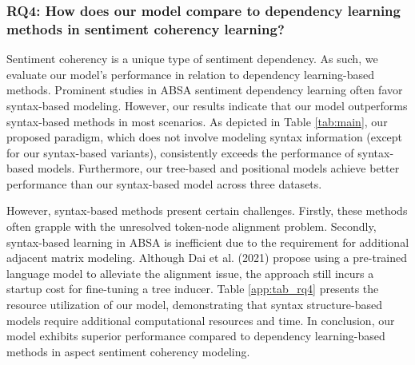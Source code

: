 \subsubsection*{RQ4: How does our model compare to dependency learning methods in sentiment coherency learning?}
\label{sec:rq4}

Sentiment coherency is a unique type of sentiment dependency. As such, we evaluate our model's performance in relation to dependency learning-based methods. Prominent studies in ABSA sentiment dependency learning often favor syntax-based modeling. However, our results indicate that our model outperforms syntax-based methods in most scenarios. As depicted in Table \ref{tab:main}, our proposed paradigm, which does not involve modeling syntax information (except for our syntax-based variants), consistently exceeds the performance of syntax-based models. Furthermore, our tree-based and positional models achieve better performance than our syntax-based model across three datasets.

However, syntax-based methods present certain challenges. Firstly, these methods often grapple with the unresolved token-node alignment problem. Secondly, syntax-based learning in ABSA is inefficient due to the requirement for additional adjacent matrix modeling. Although Dai et al. (2021) propose using a pre-trained language model to alleviate the alignment issue, the approach still incurs a startup cost for fine-tuning a tree inducer. Table \ref{app:tab_rq4} presents the resource utilization of our model, demonstrating that syntax structure-based models require additional computational resources and time. In conclusion, our model exhibits superior performance compared to dependency learning-based methods in aspect sentiment coherency modeling.

